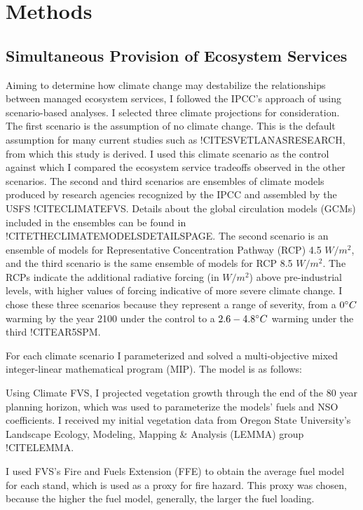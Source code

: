\section{Methods}
\subsection{Simultaneous Provision of Ecosystem Services}
\label{subsec:multiObjModel}
Aiming to determine how climate change may destabilize the relationships between managed ecosystem services, I followed the IPCC's approach of using scenario-based analyses. I selected three climate projections for consideration. The first scenario is the assumption of no climate change. This is the default assumption for many current studies such as !CITESVETLANASRESEARCH, from which this study is derived. I used this climate scenario as the control against which I  compared the ecosystem service tradeoffs observed in the other scenarios. The second and third scenarios are ensembles of climate models produced by research agencies recognized by the IPCC and assembled by the USFS !CITECLIMATEFVS. Details about the global circulation models (GCMs) included in the ensembles can be found in !CITETHECLIMATEMODELSDETAILSPAGE. The second scenario is an ensemble of models for Representative Concentration Pathway (RCP) 4.5 $W/m^2$, and the third scenario is the same ensemble of models for RCP 8.5 $W/m^2$. The RCPs indicate the additional radiative forcing (in $W/m^2$) above pre-industrial levels, with higher values of forcing indicative of more severe climate change. I chose these three scenarios because they represent a range of severity, from a $0 \degree C$ warming by the year 2100 under the control to a $2.6-4.8 \degree C$ warming under the third !CITEAR5SPM.

For each climate scenario I parameterized and solved a multi-objective mixed integer-linear mathematical program (MIP). The model is as follows:


Using Climate FVS, I projected vegetation growth through the end of the 80 year planning horizon, which was used to parameterize the models' fuels and NSO coefficients. I received my initial vegetation data from Oregon State University's Landscape Ecology, Modeling, Mapping \& Analysis (LEMMA) group !CITELEMMA.

I used FVS's Fire and Fuels Extension (FFE) to obtain the average fuel model for each stand, which is used as a proxy for fire hazard. This proxy was chosen, because the higher the fuel model, generally, the larger the fuel loading. 

